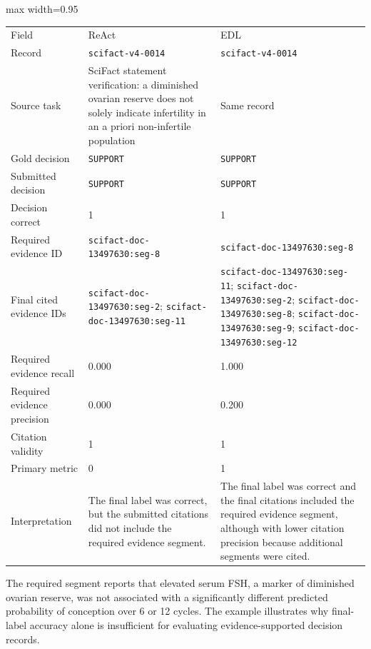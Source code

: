\documentclass[
  8pt,
]{extarticle}
\begin{document}
\begin{center}
\begin{adjustbox}{max width=0.95\textwidth}
\begin{tabular}{@{}
lll@{}}
\toprule\noalign{}
Field & ReAct & EDL \\

Record & \texttt{scifact-v4-0014} & \texttt{scifact-v4-0014} \\
Source task & SciFact statement verification: a diminished ovarian
reserve does not solely indicate infertility in an a priori
non-infertile population & Same record \\
Gold decision & \texttt{SUPPORT} & \texttt{SUPPORT} \\
Submitted decision & \texttt{SUPPORT} & \texttt{SUPPORT} \\
Decision correct & 1 & 1 \\
Required evidence ID & \texttt{scifact-doc-13497630:seg-8} &
\texttt{scifact-doc-13497630:seg-8} \\
Final cited evidence IDs & \texttt{scifact-doc-13497630:seg-2};
\texttt{scifact-doc-13497630:seg-11} &
\texttt{scifact-doc-13497630:seg-11};
\texttt{scifact-doc-13497630:seg-2};
\texttt{scifact-doc-13497630:seg-8};
\texttt{scifact-doc-13497630:seg-9};
\texttt{scifact-doc-13497630:seg-12} \\
Required evidence recall & 0.000 & 1.000 \\
Required evidence precision & 0.000 & 0.200 \\
Citation validity & 1 & 1 \\
Primary metric & 0 & 1 \\
Interpretation & The final label was correct, but the submitted
citations did not include the required evidence segment. & The final
label was correct and the final citations included the required evidence
segment, although with lower citation precision because additional
segments were cited. \\
\bottomrule
\end{tabular}
\end{adjustbox}
\end{center}

The required segment reports that elevated serum FSH, a marker of
diminished ovarian reserve, was not associated with a significantly
different predicted probability of conception over 6 or 12 cycles. The
example illustrates why final-label accuracy alone is insufficient for
evaluating evidence-supported decision records.
\end{document}
